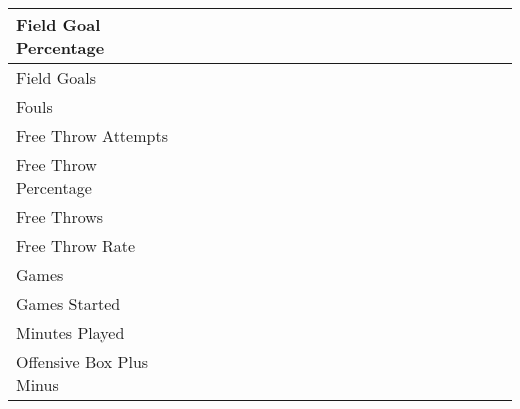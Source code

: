 \documentclass{article}
\def \cm{\checkmark}
\begin{document}
\begin{table}[ht]
\begin{tabular}{lccccccccccccccccccccc}
            \midrule
            Field Goal Percentage               &     &     &     &     & \cm & \cm & \cm & \cm & \cm & \cm & \cm & \cm & \cm & \cm & \cm & \cm & \cm & \cm & \cm & \cm & \cm \\
            \midrule
            Field Goals                         & \cm & \cm & \cm & \cm & \cm & \cm & \cm & \cm & \cm & \cm & \cm & \cm & \cm & \cm & \cm & \cm & \cm & \cm & \cm & \cm & \cm \\
            \midrule
            Fouls                               & \cm & \cm & \cm & \cm & \cm & \cm & \cm & \cm & \cm & \cm & \cm & \cm & \cm & \cm & \cm & \cm & \cm & \cm & \cm & \cm & \cm \\
            \midrule
            Free Throw Attempts                 & \cm & \cm & \cm & \cm & \cm & \cm & \cm & \cm & \cm & \cm & \cm & \cm & \cm & \cm & \cm & \cm & \cm & \cm & \cm & \cm & \cm \\
            \midrule
            Free Throw Percentage               &     &     &     &     &     &     &     &     &     & \cm & \cm & \cm & \cm & \cm & \cm & \cm & \cm & \cm & \cm & \cm & \cm \\
            \midrule
            Free Throws                         & \cm & \cm & \cm & \cm & \cm & \cm & \cm & \cm & \cm & \cm & \cm & \cm & \cm & \cm & \cm & \cm & \cm & \cm & \cm & \cm & \cm \\
            \midrule
            Free Throw Rate                     &     &     &     &     & \cm & \cm & \cm & \cm & \cm & \cm & \cm & \cm & \cm & \cm & \cm & \cm & \cm & \cm & \cm & \cm & \cm \\
            \midrule
            Games                               & \cm & \cm & \cm & \cm & \cm & \cm & \cm & \cm & \cm & \cm & \cm & \cm & \cm & \cm & \cm & \cm & \cm & \cm & \cm & \cm & \cm \\
            \midrule
            Games Started                       &     &     &     &     &     &     &     &     &     &     &     &     &     &     &     &     &     &     &     & \cm & \cm \\
            \midrule
            Minutes Played                      &     &     &     &     &     &     &     & \cm & \cm & \cm & \cm & \cm & \cm & \cm & \cm & \cm & \cm & \cm & \cm & \cm & \cm \\
            \midrule
            Offensive Box Plus Minus            &     &     &     &     &     &     &     &     &     &     &     &     & \cm & \cm & \cm & \cm & \cm & \cm & \cm & \cm & \cm \\

\end{tabular}
\end{table}
\end{document}
